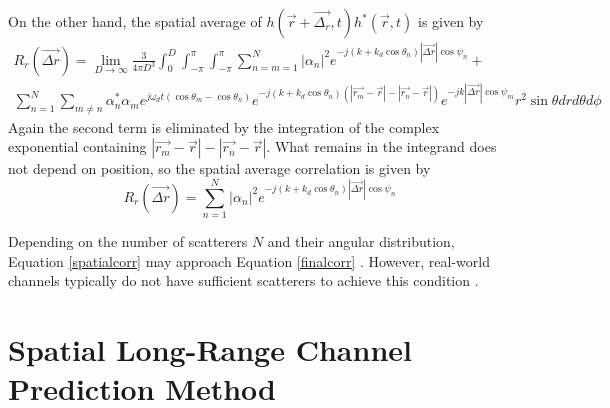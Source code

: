 \documentclass[11pt]{article} %
\begin{document}
On the other hand, the spatial average of $h(\vec{r}+\vec{\Delta_r},t)h^*(\vec{r},t)$ is given by
\begin{multline}
R_r\left(\vec{\Delta r}\right) =  \lim_{D \rightarrow \infty} \frac{3}{4\pi D^3}\int_0^D\int_{-\pi}^\pi \int_{-\pi}^{\pi} \sum_{n=m=1}^N |\alpha_n|^2 e^{-j(k+k_d\cos\theta_n)|\vec{\Delta r}|\cos \psi_n}+\\ \sum_{n=1}^N\sum_{m\neq n} \alpha_n^* \alpha_m e^{j \omega_d t(\cos \theta_m - \cos \theta_n)} e^{-j(k+k_d\cos\theta_n)\left(\left|\vec{r_m} - \vec{r}\right|-\left|\vec{r_n} - \vec{r}\right|\right)}e^{-jk\left|\vec{\Delta r}\right| \cos \psi_m}r^2 \sin\theta dr d\theta d\phi
\end{multline}
Again the second term is eliminated by the integration of the complex exponential containing $\left|\vec{r_m} - \vec{r}\right|-\left|\vec{r_n} - \vec{r}\right|$.  What remains in the integrand does not depend on position, so the spatial average correlation is given by 
\begin{equation}\label{spatialcorr}
R_r\left(\vec{\Delta r}\right) =  \sum_{n=1}^N |\alpha_n|^2 e^{-j(k+k_d\cos\theta_n)|\vec{\Delta r}|\cos \psi_n}
\end{equation}

Depending on the number of scatterers $N$ and their angular distribution, Equation \ref{spatialcorr} may approach Equation \ref{finalcorr} \cite{isukapalli}.  However, real-world channels typically do not have sufficient scatterers to achieve this condition \cite{was it Duel-Hallen who said this?}.  


\section{Spatial Long-Range Channel Prediction Method}\label{prediction}
\end{document}
